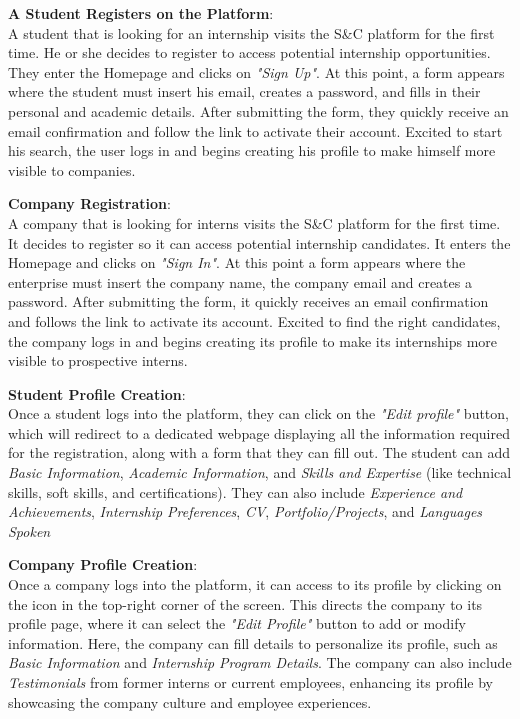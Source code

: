\begin{enumerate}[label=\textbf{[\arabic*]}, left = 0 pt, align = left]
\item \textbf{A Student Registers on the Platform}:   
\\A student that is looking for an internship visits the S\&C platform for the first time. He or she decides to register to access potential internship opportunities.
They enter the Homepage and clicks on \textit{"Sign Up"}. At this point, a form appears where the student must insert his email, creates a password, and fills in their personal and academic details. After submitting the form, they quickly receive an email confirmation and follow the link to activate their account. 
Excited to start his search, the user logs in and begins creating his profile to make himself more visible to companies.

\item \textbf{Company Registration}:                                  
\\A company that is looking for interns visits the S\&C platform for the first time. It decides to register so it can access potential internship candidates. 
It enters the Homepage and clicks on \textit{"Sign In"}. At this point a form appears where the enterprise must insert the company name, the company email and creates a password. After submitting the form, it quickly receives an email confirmation and follows the link to activate its account. 
Excited to find the right candidates, the company logs in and begins creating its profile to make its internships more visible to prospective interns.

\item \textbf{Student Profile Creation}:  
\\Once a student logs into the platform, they can click on the \textit{"Edit profile"} button, which will redirect to a dedicated webpage displaying all the information required for the registration, along with a form that they can fill out. The student can add \textit{Basic Information}, \textit{Academic Information}, and \textit{Skills and Expertise} (like technical skills, soft skills, and certifications).
They can also include \textit{Experience and Achievements}, \textit{Internship Preferences}, \textit{CV}, \textit{Portfolio/Projects}, and \textit{Languages Spoken}

\item \textbf{Company Profile Creation}: 
\\Once a company logs into the platform, it can access to its profile by clicking on the icon in the
top-right corner of the screen. This directs the company to its profile page, where it can select the \textit{"Edit Profile"} button to add or modify information. Here, the company can fill details to personalize its profile, such as \textit{Basic Information} and \textit{Internship Program Details}.
The company can also include \textit{Testimonials} from former interns or current employees, enhancing its profile by showcasing the company culture and employee experiences.


\end{enumerate}
